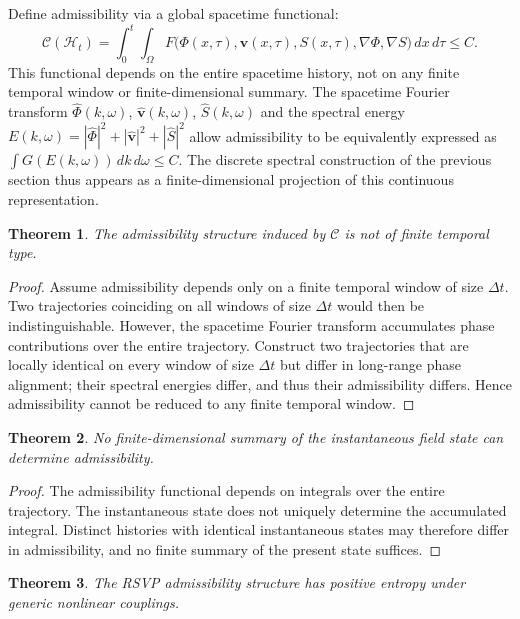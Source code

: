\documentclass[12pt, a4paper]{article}
\theoremstyle{plain}
\newtheorem{theorem}{Theorem}[section]
\theoremstyle{definition}
\theoremstyle{remark}
\begin{document}
Define admissibility via a global spacetime functional:
\[
\mathcal{C}(\mathcal{H}_t) = \int_0^t \int_{\Omega} F\bigl(\Phi(x,\tau), \mathbf{v}(x,\tau), S(x,\tau), \nabla\Phi, \nabla S\bigr)\,dx\,d\tau \le C.
\]
This functional depends on the entire spacetime history, not on any finite temporal window or finite-dimensional summary. The spacetime Fourier transform $\hat{\Phi}(k,\omega)$, $\hat{\mathbf{v}}(k,\omega)$, $\hat{S}(k,\omega)$ and the spectral energy $E(k,\omega) = |\hat{\Phi}|^2 + |\hat{\mathbf{v}}|^2 + |\hat{S}|^2$ allow admissibility to be equivalently expressed as $\int G(E(k,\omega))\,dk\,d\omega \le C$. The discrete spectral construction of the previous section thus appears as a finite-dimensional projection of this continuous representation.

\begin{theorem}
The admissibility structure induced by $\mathcal{C}$ is not of finite temporal type.
\end{theorem}

\begin{proof}
Assume admissibility depends only on a finite temporal window of size $\Delta t$. Two trajectories coinciding on all windows of size $\Delta t$ would then be indistinguishable. However, the spacetime Fourier transform accumulates phase contributions over the entire trajectory. Construct two trajectories that are locally identical on every window of size $\Delta t$ but differ in long-range phase alignment; their spectral energies differ, and thus their admissibility differs. Hence admissibility cannot be reduced to any finite temporal window.
\end{proof}

\begin{theorem}
No finite-dimensional summary of the instantaneous field state can determine admissibility.
\end{theorem}

\begin{proof}
The admissibility functional depends on integrals over the entire trajectory. The instantaneous state does not uniquely determine the accumulated integral. Distinct histories with identical instantaneous states may therefore differ in admissibility, and no finite summary of the present state suffices.
\end{proof}

\begin{theorem}
The RSVP admissibility structure has positive entropy under generic nonlinear couplings.
\end{theorem}
\end{document}
